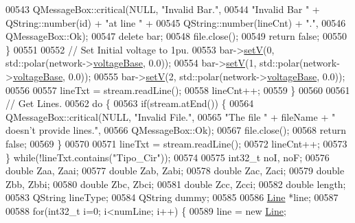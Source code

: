 \begin{DoxyCode}
00543       QMessageBox::critical(NULL, \textcolor{stringliteral}{"Invalid Bar."},
00544                             \textcolor{stringliteral}{"Invalid Bar "} + QString::number(\textcolor{keywordtype}{id}) + \textcolor{stringliteral}{"at line "} +
00545                             QString::number(lineCnt) + \textcolor{stringliteral}{"."},
00546                             QMessageBox::Ok);
00547       \textcolor{keyword}{delete} bar;
00548       file.close();
00549       \textcolor{keywordflow}{return} \textcolor{keyword}{false};
00550     \}
00551 
00552     \textcolor{comment}{// Set Initial voltage to 1pu.}
00553     bar->\hyperlink{group___models_ga9b6fbc92674bfcdc9d5090795ab335a6}{setV}(0, std::polar(network->\hyperlink{group___graphics_ga7c1e79d9ac69df9a69f24eaf092fd5e5}{voltageBase}, 0.0));
00554     bar->\hyperlink{group___models_ga9b6fbc92674bfcdc9d5090795ab335a6}{setV}(1, std::polar(network->\hyperlink{group___graphics_ga7c1e79d9ac69df9a69f24eaf092fd5e5}{voltageBase}, 0.0));
00555     bar->\hyperlink{group___models_ga9b6fbc92674bfcdc9d5090795ab335a6}{setV}(2, std::polar(network->\hyperlink{group___graphics_ga7c1e79d9ac69df9a69f24eaf092fd5e5}{voltageBase}, 0.0));
00556 
00557     lineTxt = stream.readLine();
00558     lineCnt++;
00559   \}
00560 
00561   \textcolor{comment}{// Get Lines.}
00562   \textcolor{keywordflow}{do} \{
00563     \textcolor{keywordflow}{if}(stream.atEnd()) \{
00564       QMessageBox::critical(NULL, \textcolor{stringliteral}{"Invalid File."},
00565                             \textcolor{stringliteral}{"The file "} + fileName + \textcolor{stringliteral}{" doesn't provide lines."},
00566                             QMessageBox::Ok);
00567       file.close();
00568       \textcolor{keywordflow}{return} \textcolor{keyword}{false};
00569     \}
00570 
00571     lineTxt = stream.readLine();
00572     lineCnt++;
00573   \} \textcolor{keywordflow}{while}(!lineTxt.contains(\textcolor{stringliteral}{"Tipo\_Cir"}));
00574 
00575   int32\_t noI, noF;
00576   \textcolor{keywordtype}{double} Zaa, Zaai;
00577   \textcolor{keywordtype}{double} Zab, Zabi;
00578   \textcolor{keywordtype}{double} Zac, Zaci;
00579   \textcolor{keywordtype}{double} Zbb, Zbbi;
00580   \textcolor{keywordtype}{double} Zbc, Zbci;
00581   \textcolor{keywordtype}{double} Zcc, Zcci;
00582   \textcolor{keywordtype}{double} length;
00583   QString lineType;
00584   QString dummy;
00585 
00586   \hyperlink{class_line}{Line} *line;
00587 
00588   \textcolor{keywordflow}{for}(int32\_t i=0; i<numLine; i++) \{
00589     line = \textcolor{keyword}{new} \hyperlink{class_line}{Line};

\end{DoxyCode}
